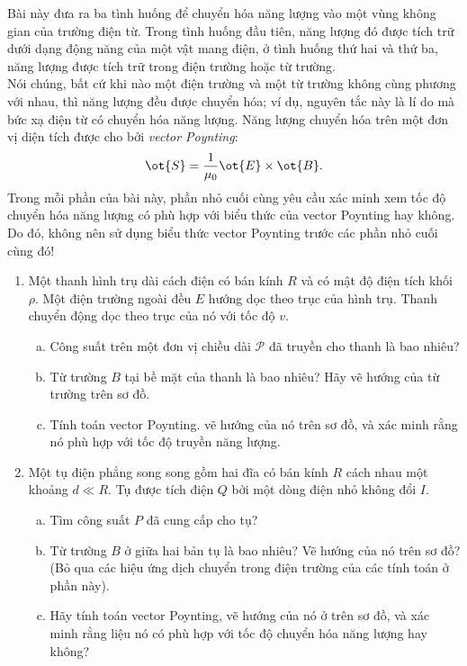 \begin{vd}
Bài này đưa ra ba tình huống để chuyển hóa năng lượng vào một vùng không gian của trường điện từ. Trong tình huống đầu tiên, năng lượng đó được tích trữ dưới dạng động năng của một vật mang điện, ở tình huống thứ hai và thứ ba, năng lượng được tích trữ trong điện trường hoặc từ trường.\\
Nói chúng, bất cứ khi nào một điện trường và một từ trường không cùng phương với nhau, thì năng lượng đều được chuyển hóa; ví dụ, nguyên tắc này là lí do mà bức xạ điện từ có chuyển hóa năng lượng. Năng lượng chuyển hóa trên một đơn vị diện tích được cho bởi \textit{vector Poynting}:
$$\ot{S}=\dfrac{1}{\mu_0}\ot{E}\times\ot{B}.$$
Trong mỗi phần của bài này, phần nhỏ cuối cùng yêu cầu xác minh xem tốc độ chuyển hóa năng lượng có phù hợp với biểu thức của vector Poynting hay không. Do đó, không nên sử dụng biểu thức vector Poynting trước các phần nhỏ cuối cùng đó!
\begin{enumerate}[1)]
    \item Một thanh hình trụ dài cách điện có bán kính $R$ và có mật độ điện tích khối $\rho$. Một điện trường ngoài đều $E$ hướng dọc theo trục của hình trụ. Thanh chuyển động dọc theo trục của nó với tốc độ $v$.
    \begin{enumerate}[a)]
        \item Công suất trên một đơn vị chiều dài $\mathcal{P}$ đã truyền cho thanh là bao nhiêu?
        \item Từ trường $B$ tại bề mặt của thanh là bao nhiêu? Hãy vẽ hướng của từ trường trên sơ đồ.
        \item Tính toán vector Poynting. vẽ hướng của nó trên sơ đồ, và xác minh rằng nó phù hợp với tốc độ truyền năng lượng.
    \end{enumerate}
    \item Một tụ điện phẳng song song gồm hai đĩa có bán kính $R$ cách nhau một khoảng $d\ll R$. Tụ được tích điện $Q$ bởi một dòng điện nhỏ không đổi $I$.
    \begin{enumerate}[a)]
        \item Tìm công suất $P$ đã cung cấp cho tụ?
        \item Từ trường $B$ ở giữa hai bản tụ là bao nhiêu? Vẽ hướng của nó trên sơ đồ? (Bỏ qua các hiệu ứng dịch chuyển trong điện trường của các tính toán ở phần này).
        \item Hãy tính toán vector Poynting, vẽ hướng của nó ở trên sơ đồ, và xác minh rằng liệu nó có phù hợp với tốc độ chuyển hóa năng lượng hay không?

\end{enumerate}
\end{enumerate}
\end{vd}
